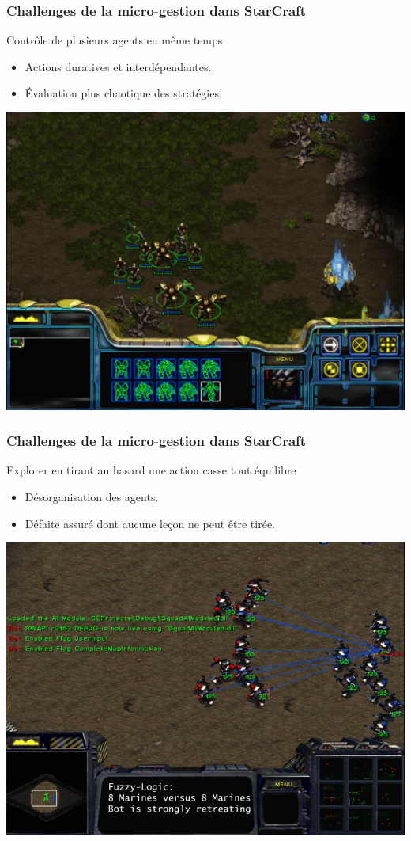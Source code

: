 \documentclass[smaller]{beamer}
\begin{document}

\begin{frame}
  \frametitle{Challenges de la micro-gestion dans StarCraft}

  \begin{alertblock}{Contrôle de plusieurs agents en même temps}
    \begin{itemize}
    \item Actions duratives et interdépendantes.
    \item Évaluation plus chaotique des stratégies.
    \end{itemize}
  \end{alertblock}
  
  \centerline{\includegraphics[width=0.7\linewidth]{./figs/starcraft_group}}  
    
\end{frame}


\begin{frame}
  \frametitle{Challenges de la micro-gestion dans StarCraft}

  \begin{alertblock}{Explorer en tirant au hasard une action casse tout équilibre}
    \begin{itemize}
    \item Désorganisation des agents.
    \item Défaite assuré dont aucune leçon ne peut être tirée.
    \end{itemize}
  \end{alertblock}

  \centerline{\includegraphics[width=0.7\linewidth]{./figs/starcraft_squad}}  
    
\end{frame}
\end{document}
